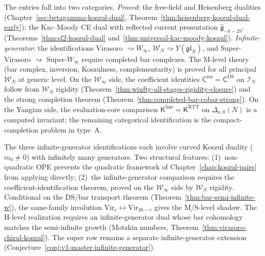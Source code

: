 \begin{remark}\label{rem:koszul-table-status}
The entries fall into two categories.
\emph{Proved}: the free-field and Heisenberg dualities (Chapter~\ref{sec:betagamma-koszul-dual}, Theorem~\ref{thm:heisenberg-koszul-dual-early}); the Kac--Moody CE dual with reflected current presentation $\widehat{\mathfrak{g}}_{-k-2h^\vee}$ (Theorems~\ref{thm:sl2-koszul-dual} and~\ref{thm:universal-kac-moody-koszul}).
\emph{Infinite-generator}: the identifications
Virasoro $\rightsquigarrow W_\infty$,
$\mathcal{W}_N \rightsquigarrow Y(\mathfrak{gl}_N)$, and
Super-Virasoro $\rightsquigarrow$ Super-$W_\infty$ require completed
bar complexes. The M-level theory (bar complex, inversion,
Koszulness, complementarity) is proved for all principal
$\mathcal{W}_N$ at generic level. On the $\mathcal{W}_\infty$ side,
the coefficient identities
$\mathsf{C}^{\mathrm{res}}=\mathsf{C}^{\mathrm{DS}}$ on
$\mathcal{I}_N$ follow from $\mathcal{W}_N$ rigidity
(Theorem~\ref{thm:winfty-all-stages-rigidity-closure}) and the
strong completion theorem
(Theorem~\ref{thm:completed-bar-cobar-strong}). On the Yangian side,
the evaluation-core comparison
$\mathsf{K}^{\mathrm{line}}=\mathsf{K}^{\mathrm{RTT}}$ on
$\Delta_{a,0}(N)$ is a computed invariant; the remaining categorical
identification is the compact-completion problem in type~A.
\end{remark}

\begin{remark}
The three infinite-generator identifications each involve curved
Koszul duality ($m_0 \neq 0$) with infinitely many generators. Two
structural features: (1)~non-quadratic OPE prevents the quadratic
framework of Chapter~\ref{chap:koszul-pairs} from applying directly;
(2)~the infinite-generator comparison requires the
coefficient-identification theorem, proved on the
$\mathcal{W}_\infty$ side by $\mathcal{W}_N$ rigidity. Conditional
on the DS/bar transport theorem
\textup{(}Theorem~\textup{\ref{thm:bar-semi-infinite-w}}\textup{)},
the same-family involution $\mathrm{Vir}_c \leftrightarrow
\mathrm{Vir}_{26-c}$ gives the M/S-level shadow. The H-level
realization requires an infinite-generator dual whose bar cohomology
matches the semi-infinite growth (Motzkin numbers,
Theorem~\ref{thm:virasoro-chiral-koszul}). The super row remains a
separate infinite-generator extension
(Conjecture~\ref{conj:v1-master-infinite-generator}).
\end{remark}

